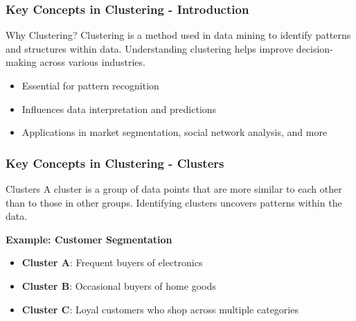 \documentclass[aspectratio=169]{beamer}
\begin{document}
\begin{frame}[fragile]
    \frametitle{Key Concepts in Clustering - Introduction}
    \begin{block}{Why Clustering?}
        Clustering is a method used in data mining to identify patterns and structures within data. Understanding clustering helps improve decision-making across various industries.
    \end{block}
    \begin{itemize}
        \item Essential for pattern recognition
        \item Influences data interpretation and predictions
        \item Applications in market segmentation, social network analysis, and more
    \end{itemize}
\end{frame}

\begin{frame}[fragile]
    \frametitle{Key Concepts in Clustering - Clusters}
    \begin{block}{Clusters}
        A cluster is a group of data points that are more similar to each other than to those in other groups. Identifying clusters uncovers patterns within the data.
    \end{block}
    \begin{example}
        \textbf{Example: Customer Segmentation}
        \begin{itemize}
            \item \textbf{Cluster A}: Frequent buyers of electronics
            \item \textbf{Cluster B}: Occasional buyers of home goods
            \item \textbf{Cluster C}: Loyal customers who shop across multiple categories
        \end{itemize}
    \end{example}
\end{frame}
\end{document}
